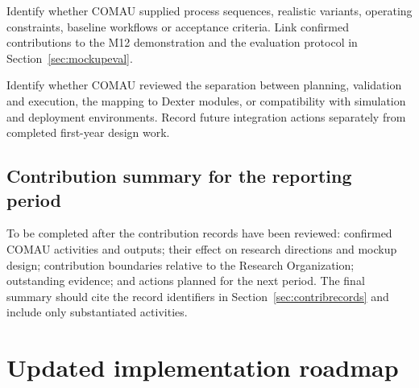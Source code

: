 \documentclass{plan4ari_report}
\begin{document}
 Identify whether COMAU supplied process sequences, realistic variants, operating constraints, baseline workflows or acceptance criteria. Link confirmed contributions to the M12 demonstration and the evaluation protocol in Section~\ref{sec:mockupeval}.

 Identify whether COMAU reviewed the separation between planning, validation and execution, the mapping to Dexter modules, or compatibility with simulation and deployment environments. Record future integration actions separately from completed first-year design work.

\subsection{Contribution summary for the reporting period}
\begin{planbox}
To be completed after the contribution records have been reviewed: confirmed COMAU activities and outputs; their effect on research directions and mockup design; contribution boundaries relative to the Research Organization; outstanding evidence; and actions planned for the next period. The final summary should cite the record identifiers in Section~\ref{sec:contribrecords} and include only substantiated activities.
\end{planbox}

\section{Updated implementation roadmap}\label{sec:roadmap}
\end{document}
